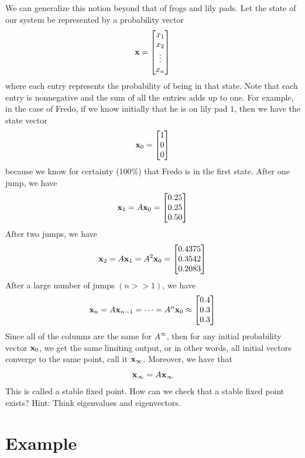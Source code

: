We can generalize this notion beyond that of frogs and lily pads.  Let the state of our system be represented by a probability vector
\[
{\bf x} = \begin{bmatrix}
x_1\\
x_2\\
\vdots\\
x_n
\end{bmatrix}
\]
where each entry represents the probability of being in that state.  Note that each entry is nonnegative and the sum of all the entries adds up to one.  For example, in the case of Fredo, if we know initially that he is on lily pad $1$, then we have the state vector
\[
{\bf x}_0 = \begin{bmatrix}
1\\
0\\
0
\end{bmatrix}
\]
because we know for certainty (100\%) that Fredo is in the first state.  After one jump, we have
\[
{\bf x}_1 = A {\bf x}_0 = \begin{bmatrix}
0.25\\
0.25\\
0.50
\end{bmatrix}
\]
After two jumps, we have
\[
{\bf x}_2 = A {\bf x}_1 = A^2 {\bf x}_0 = \begin{bmatrix}
0.4375\\
0.3542\\
0.2083
\end{bmatrix}
\]
After a large number of jumps $(n>>1)$, we have
\[
{\bf x}_n = A {\bf x}_{n-1} = \dots = A^n {\bf x}_0 \approx \begin{bmatrix}
0.4\\
0.3\\
0.3
\end{bmatrix}
\]
Since all of the columns are the same for $A^\infty$, then for any initial probability vector ${\bf x}_0$, we get the same limiting output, or in other words, all initial vectors converge to the same point, call it ${\bf x}_\infty$.  Moreover, we have that
\[
{\bf x}_\infty = A {\bf x}_\infty
\]
This is called a stable fixed point.  How can we check that a stable fixed point exists?  Hint: Think eigenvalues and eigenvectors.

\section*{Example}

